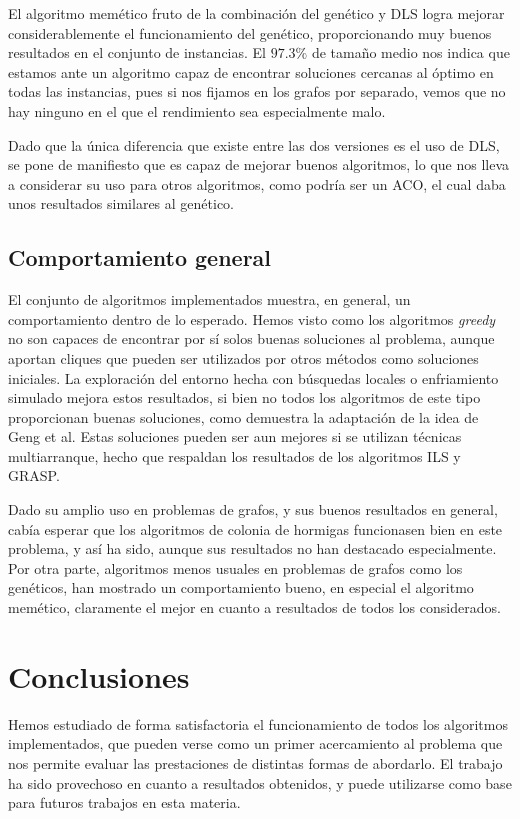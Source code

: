 El algoritmo memético fruto de la combinación del genético y DLS logra mejorar
considerablemente el funcionamiento del genético, proporcionando muy buenos resultados
en el conjunto de instancias. El $97.3\%$ de tamaño medio nos indica que estamos
ante un algoritmo capaz de encontrar soluciones cercanas al óptimo en todas las
instancias, pues si nos fijamos en los grafos por separado, vemos que no hay ninguno
en el que el rendimiento sea especialmente malo.

Dado que la única diferencia que existe entre las dos versiones es el uso de DLS,
se pone de  manifiesto que es capaz de mejorar buenos algoritmos, lo que nos lleva
a considerar su uso para otros algoritmos, como podría ser un ACO, el cual daba
unos resultados similares al genético.

\subsection{Comportamiento general}

El conjunto de algoritmos implementados muestra, en general, un comportamiento dentro de
lo esperado. Hemos visto como los algoritmos \textit{greedy} no son capaces de encontrar
por sí solos buenas soluciones al problema, aunque aportan cliques que pueden ser utilizados
por otros métodos como soluciones iniciales. La exploración del entorno hecha con búsquedas
locales o enfriamiento simulado mejora estos resultados, si bien no todos los algoritmos de
este tipo proporcionan buenas soluciones, como demuestra la adaptación de la idea de Geng
et al. Estas soluciones pueden ser aun mejores si se utilizan técnicas multiarranque,
hecho que respaldan los resultados de los algoritmos ILS y GRASP.

Dado su amplio uso en problemas de grafos, y sus buenos resultados en general, cabía
esperar que los algoritmos de colonia de hormigas funcionasen bien en este problema, y
así ha sido, aunque sus resultados no han destacado especialmente. Por otra parte,
algoritmos menos usuales en problemas de grafos como los genéticos, han mostrado un
comportamiento bueno, en especial el algoritmo memético, claramente el mejor en
cuanto a resultados de todos los considerados.

\section{Conclusiones}

Hemos estudiado de forma satisfactoria el funcionamiento de todos los algoritmos implementados,
que pueden verse como un primer acercamiento al problema que nos permite evaluar las
prestaciones de distintas formas de abordarlo. El trabajo ha sido provechoso en cuanto
a resultados obtenidos, y puede utilizarse como base para futuros trabajos en esta materia.


